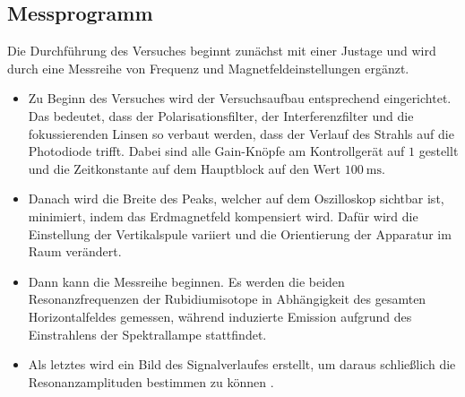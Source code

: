 \subsection{Messprogramm}

Die Durchführung des Versuches beginnt zunächst mit einer Justage und wird 
durch eine Messreihe von Frequenz und Magnetfeldeinstellungen ergänzt.

\begin{itemize}
    \item Zu Beginn des Versuches wird der Versuchsaufbau entsprechend eingerichtet.
    Das bedeutet, dass der Polarisationsfilter, der Interferenzfilter und die 
    fokussierenden Linsen so verbaut werden, dass der Verlauf des Strahls auf die 
    Photodiode trifft.
    Dabei sind alle Gain-Knöpfe am Kontrollgerät auf $1$ gestellt und die Zeitkonstante auf 
    dem Hauptblock auf den Wert $\SI{100}{\milli\second}$.
    \item Danach wird die Breite des Peaks, welcher auf dem Oszilloskop sichtbar ist, 
    minimiert, indem das Erdmagnetfeld kompensiert wird. Dafür wird die Einstellung der 
    Vertikalspule variiert und die Orientierung der Apparatur im Raum verändert.
    \item Dann kann die Messreihe beginnen. Es werden die beiden Resonanzfrequenzen
    der Rubidiumisotope in Abhängigkeit des gesamten Horizontalfeldes gemessen,
    während induzierte Emission aufgrund des Einstrahlens der Spektrallampe 
    stattfindet.
    \item Als letztes wird ein Bild des Signalverlaufes erstellt, um daraus schließlich
    die Resonanzamplituden bestimmen zu können \cite{3}.
\end{itemize}
\newpage